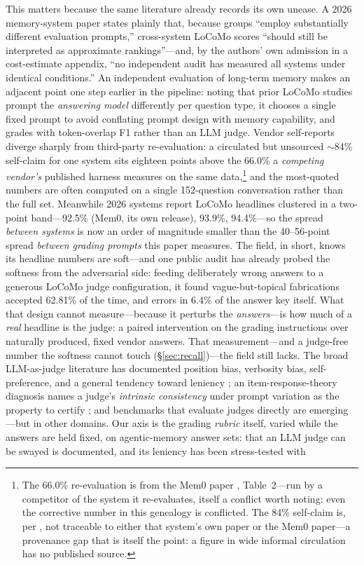 \documentclass[11pt]{article}
\begin{document}
This matters because the same literature already records its own unease. A 2026 memory-system paper states plainly that, because groups ``employ substantially different evaluation prompts,'' cross-system LoCoMo scores ``should still be interpreted as approximate rankings''\citep[\S5.3]{synthius}---and, by the authors' own admission in a cost-estimate appendix, ``no independent audit has measured all systems under identical conditions.''\citep[App.~A.5]{synthius} An independent evaluation of long-term memory makes an adjacent point one step earlier in the pipeline: noting that prior LoCoMo studies prompt the \emph{answering model} differently per question type, it chooses a single fixed prompt to avoid conflating prompt design with memory capability, and grades with token-overlap F1 rather than an LLM judge.\citep{terranova} Vendor self-reports diverge sharply from third-party re-evaluation: a circulated but unsourced ${\sim}$84\% self-claim for one system sits eighteen points above the 66.0\% a \emph{competing vendor's} published harness measures on the same data,\footnote{The 66.0\% re-evaluation is from the Mem0 paper \citep{mem0}, Table~2---run by a competitor of the system it re-evaluates, itself a conflict worth noting: even the corrective number in this genealogy is conflicted. The 84\% self-claim is, per , not traceable to either that system's own paper or the Mem0 paper---a provenance gap that is itself the point: a figure in wide informal circulation has no published source.} and the most-quoted numbers are often computed on a single 152-question conversation rather than the full set. Meanwhile 2026 systems report LoCoMo headlines clustered in a two-point band---92.5\% (Mem0, its own release), 93.9\%\citep{mnemis}, 94.4\%\citep{synthius}---so the spread \emph{between systems} is now an order of magnitude smaller than the 40--56-point spread \emph{between grading prompts} this paper measures. The field, in short, knows its headline numbers are soft---and one public audit has already probed the softness from the adversarial side: feeding deliberately wrong answers to a generous LoCoMo judge configuration, it found vague-but-topical fabrications accepted 62.81\% of the time, and errors in 6.4\% of the answer key itself\citep{locomoaudit}. What that design cannot measure---because it perturbs the \emph{answers}---is how much of a \emph{real} headline is the judge: a paired intervention on the grading instructions over naturally produced, fixed vendor answers. That measurement---and a judge-free number the softness cannot touch (\S\ref{sec:recall})---the field still lacks. The broad LLM-as-judge literature has documented position bias, verbosity bias, self-preference, and a general tendency toward leniency \citep{mtbench,posbias,verbosity,selfpref,leniency}; an item-response-theory diagnosis names a judge's \emph{intrinsic consistency} under prompt variation as the property to certify \citep{choi-irt}; and benchmarks that evaluate judges directly are emerging \citep{tan2024judgebench,zhou2026taxonomicbias}---but in other domains. Our axis is the grading \emph{rubric} itself, varied while the answers are held fixed, on agentic-memory answer sets: that an LLM judge can be swayed is documented, and its leniency has been stress-tested with 
\end{document}
